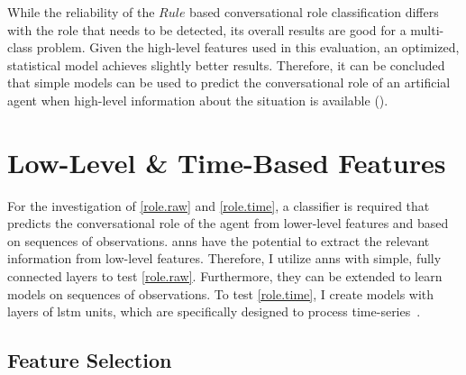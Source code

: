 While the reliability of the \(Rule\) based \gls{conversational role} classification differs with the role that needs to be detected, its overall results are good for a multi-class problem.
Given the high-level features used in this evaluation, an optimized, statistical model achieves slightly better results.
Therefore, it can be concluded that simple models can be used to predict the \gls{conversational role} of an \gls{artificial agent} when high-level information about the situation is available ().

\section{Low-Level \& Time-Based Features}

For the investigation of \cref{role.raw} and \cref{role.time}, a classifier is required that predicts the \gls{conversational role} of the agent from lower-level features and based on sequences of observations.
\Glspl{ann} have the potential to extract the relevant information from low-level features.
Therefore, I utilize \glspl{ann} with simple, fully connected layers to test \cref{role.raw}.
Furthermore, they can be extended to learn models on sequences of observations.
To test \cref{role.time}, I create models with layers of \gls{lstm} units, which are specifically designed to process time-series~\cite[]{Hochreiter1997}.

\subsection{Feature Selection}\label{sec:role-ann-features}

